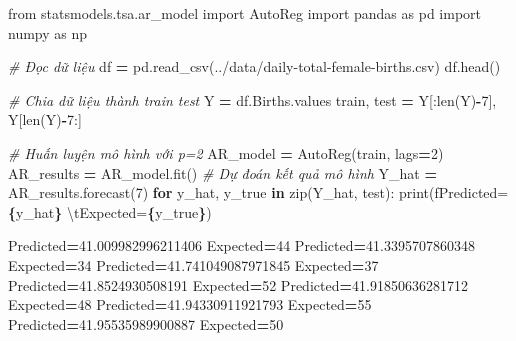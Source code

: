 \documentclass[
]{book}
\newenvironment{Shaded}{\begin{snugshade}}{\end{snugshade}}
\newcommand{\BuiltInTok}[1]{#1}
\newcommand{\CharTok}[1]{\textcolor[rgb]{0.31,0.60,0.02}{#1}}
\newcommand{\CommentTok}[1]{\textcolor[rgb]{0.56,0.35,0.01}{\textit{#1}}}
\newcommand{\ControlFlowTok}[1]{\textcolor[rgb]{0.13,0.29,0.53}{\textbf{#1}}}
\newcommand{\DecValTok}[1]{\textcolor[rgb]{0.00,0.00,0.81}{#1}}
\newcommand{\FloatTok}[1]{\textcolor[rgb]{0.00,0.00,0.81}{#1}}
\newcommand{\ImportTok}[1]{#1}
\newcommand{\KeywordTok}[1]{\textcolor[rgb]{0.13,0.29,0.53}{\textbf{#1}}}
\newcommand{\NormalTok}[1]{#1}
\newcommand{\OperatorTok}[1]{\textcolor[rgb]{0.81,0.36,0.00}{\textbf{#1}}}
\newcommand{\SpecialCharTok}[1]{\textcolor[rgb]{0.81,0.36,0.00}{\textbf{#1}}}
\newcommand{\SpecialStringTok}[1]{\textcolor[rgb]{0.31,0.60,0.02}{#1}}
\newcommand{\StringTok}[1]{\textcolor[rgb]{0.31,0.60,0.02}{#1}}
\begin{document}
\begin{Shaded}
\begin{Highlighting}[]
\ImportTok{from}\NormalTok{ statsmodels.tsa.ar\_model }\ImportTok{import}\NormalTok{ AutoReg}
\ImportTok{import}\NormalTok{ pandas }\ImportTok{as}\NormalTok{ pd }
\ImportTok{import}\NormalTok{ numpy }\ImportTok{as}\NormalTok{ np}

\CommentTok{\# Đọc dữ liệu}
\NormalTok{df }\OperatorTok{=}\NormalTok{ pd.read\_csv(}\StringTok{\textquotesingle{}../data/daily{-}total{-}female{-}births.csv\textquotesingle{}}\NormalTok{)}
\NormalTok{df.head()}

\CommentTok{\# Chia dữ liệu thành train test}
\NormalTok{Y }\OperatorTok{=}\NormalTok{ df.Births.values}
\NormalTok{train, test }\OperatorTok{=}\NormalTok{ Y[:}\BuiltInTok{len}\NormalTok{(Y)}\OperatorTok{{-}}\DecValTok{7}\NormalTok{], Y[}\BuiltInTok{len}\NormalTok{(Y)}\OperatorTok{{-}}\DecValTok{7}\NormalTok{:]}

\CommentTok{\# Huấn luyện mô hình với p=2}
\NormalTok{AR\_model }\OperatorTok{=}\NormalTok{ AutoReg(train, lags}\OperatorTok{=}\DecValTok{2}\NormalTok{)}
\NormalTok{AR\_results }\OperatorTok{=}\NormalTok{ AR\_model.fit()}
\CommentTok{\# Dự đoán kết quả mô hình}
\NormalTok{Y\_hat }\OperatorTok{=}\NormalTok{ AR\_results.forecast(}\DecValTok{7}\NormalTok{)}
\ControlFlowTok{for}\NormalTok{ y\_hat, y\_true }\KeywordTok{in} \BuiltInTok{zip}\NormalTok{(Y\_hat, test):}
    \BuiltInTok{print}\NormalTok{(}\SpecialStringTok{f\textquotesingle{}Predicted=}\SpecialCharTok{\{}\NormalTok{y\_hat}\SpecialCharTok{\}}\SpecialStringTok{ }\CharTok{\textbackslash{}t}\SpecialStringTok{Expected=}\SpecialCharTok{\{}\NormalTok{y\_true}\SpecialCharTok{\}}\SpecialStringTok{\textquotesingle{}}\NormalTok{)}
\end{Highlighting}
\end{Shaded}

\begin{Shaded}
\begin{Highlighting}[]
\NormalTok{Predicted}\OperatorTok{=}\FloatTok{41.009982996211406}\NormalTok{    Expected}\OperatorTok{=}\DecValTok{44}
\NormalTok{Predicted}\OperatorTok{=}\FloatTok{41.3395707860348}\NormalTok{      Expected}\OperatorTok{=}\DecValTok{34}
\NormalTok{Predicted}\OperatorTok{=}\FloatTok{41.741049087971845}\NormalTok{    Expected}\OperatorTok{=}\DecValTok{37}
\NormalTok{Predicted}\OperatorTok{=}\FloatTok{41.8524930508191}\NormalTok{      Expected}\OperatorTok{=}\DecValTok{52}
\NormalTok{Predicted}\OperatorTok{=}\FloatTok{41.91850636281712}\NormalTok{     Expected}\OperatorTok{=}\DecValTok{48}
\NormalTok{Predicted}\OperatorTok{=}\FloatTok{41.94330911921793}\NormalTok{     Expected}\OperatorTok{=}\DecValTok{55}
\NormalTok{Predicted}\OperatorTok{=}\FloatTok{41.95535989900887}\NormalTok{     Expected}\OperatorTok{=}\DecValTok{50}
\end{Highlighting}
\end{Shaded}
\end{document}
